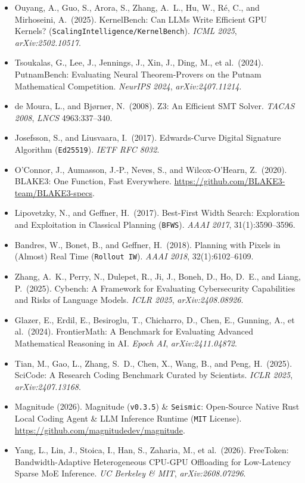 \documentclass[10pt]{article}
\begin{document}
{\begin{itemize}
  \item Ouyang, A., Guo, S., Arora, S., Zhang, A.\ L., Hu, W., R\'e, C., and Mirhoseini, A.\ (2025). KernelBench: Can LLMs Write Efficient GPU Kernels? (\texttt{ScalingIntelligence/KernelBench}). \emph{ICML 2025}, \emph{arXiv:2502.10517}.
  \item Tsoukalas, G., Lee, J., Jennings, J., Xin, J., Ding, M., et al.\ (2024). PutnamBench: Evaluating Neural Theorem-Provers on the Putnam Mathematical Competition. \emph{NeurIPS 2024}, \emph{arXiv:2407.11214}.
  \item de Moura, L., and Bj\o rner, N.\ (2008). Z3: An Efficient SMT Solver. \emph{TACAS 2008}, \emph{LNCS} 4963:337--340.
  \item Josefsson, S., and Liusvaara, I.\ (2017). Edwards-Curve Digital Signature Algorithm (\texttt{Ed25519}). \emph{IETF RFC 8032}.
  \item O'Connor, J., Aumasson, J.-P., Neves, S., and Wilcox-O'Hearn, Z.\ (2020). BLAKE3: One Function, Fast Everywhere. \url{https://github.com/BLAKE3-team/BLAKE3-specs}.
  \item Lipovetzky, N., and Geffner, H.\ (2017). Best-First Width Search: Exploration and Exploitation in Classical Planning (\texttt{BFWS}). \emph{AAAI 2017}, 31(1):3590--3596.
  \item Bandres, W., Bonet, B., and Geffner, H.\ (2018). Planning with Pixels in (Almost) Real Time (\texttt{Rollout IW}). \emph{AAAI 2018}, 32(1):6102--6109.
  \item Zhang, A.\ K., Perry, N., Dulepet, R., Ji, J., Boneh, D., Ho, D.\ E., and Liang, P.\ (2025). Cybench: A Framework for Evaluating Cybersecurity Capabilities and Risks of Language Models. \emph{ICLR 2025}, \emph{arXiv:2408.08926}.
  \item Glazer, E., Erdil, E., Besiroglu, T., Chicharro, D., Chen, E., Gunning, A., et al.\ (2024). FrontierMath: A Benchmark for Evaluating Advanced Mathematical Reasoning in AI. \emph{Epoch AI}, \emph{arXiv:2411.04872}.
  \item Tian, M., Gao, L., Zhang, S.\ D., Chen, X., Wang, B., and Peng, H.\ (2025). SciCode: A Research Coding Benchmark Curated by Scientists. \emph{ICLR 2025}, \emph{arXiv:2407.13168}.
  \item Magnitude (2026). Magnitude (\texttt{v0.3.5}) \& \texttt{Seismic}: Open-Source Native Rust Local Coding Agent \& LLM Inference Runtime (\texttt{MIT} License). \url{https://github.com/magnitudedev/magnitude}.
  \item Yang, L., Lin, J., Stoica, I., Han, S., Zaharia, M., et al.\ (2026). FreeToken: Bandwidth-Adaptive Heterogeneous CPU-GPU Offloading for Low-Latency Sparse MoE Inference. \emph{UC Berkeley \& MIT}, \emph{arXiv:2608.07296}.

\end{itemize}}
\end{document}
